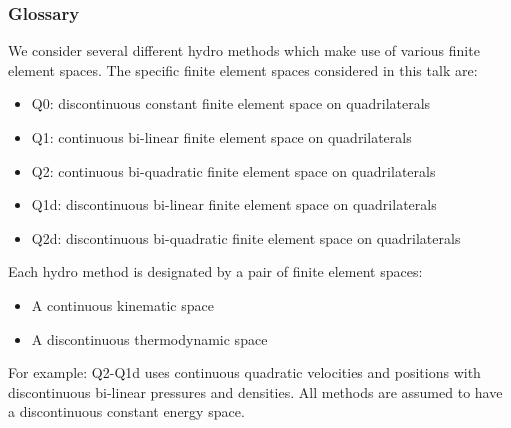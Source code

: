 \documentclass[8pt,xcolor=svgnames]{beamer}
\begin{document}
\begin{frame}
 \frametitle{Glossary}
 We consider several different hydro methods which make use of various finite element spaces. The specific finite element spaces considered in this talk are:
 \medskip
 \begin{itemize}
  \item Q0: discontinuous constant finite element space on quadrilaterals
  \item Q1: continuous bi-linear finite element space on quadrilaterals
  \item Q2: continuous bi-quadratic finite element space on quadrilaterals
  \item Q1d: discontinuous bi-linear finite element space on quadrilaterals
  \item Q2d: discontinuous bi-quadratic finite element space on quadrilaterals
 \end{itemize}
 \medskip
 Each hydro method is designated by a pair of finite element spaces:
 \medskip
 \begin{itemize}
  \item A continuous kinematic space
  \item A discontinuous thermodynamic space
 \end{itemize}
\begin{center}
\medskip
\begin{block}{For example: }
Q2-Q1d uses continuous quadratic velocities and positions with discontinuous bi-linear pressures and densities. All methods are assumed to have a discontinuous constant energy space.
\end{block}
\end{center}
\end{frame}
\end{document}
